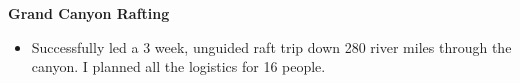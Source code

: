 \documentclass[11pt]{resume}
\begin{document}
\begin{minipage}[t]{1\textwidth}
      \vspace{.5em}
      {\bf Grand Canyon Rafting}
      \vspace{.5em}
      \begin{addmargin}[.5em]{0em}
        \begin{itemize}
          \setlength\itemsep{-.2em}

        \item {Successfully led a 3 week, unguided raft trip down 280 river
          miles through the canyon. I planned all the logistics for 16 people.}


        \end{itemize}
      \end{addmargin}
    \end{minipage}
\end{document}
